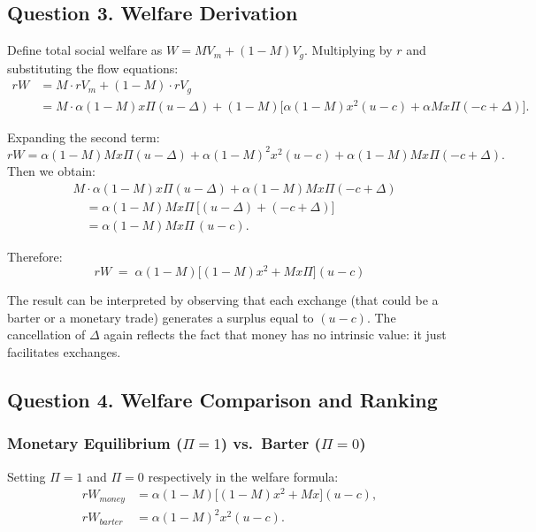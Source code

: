 \documentclass[11pt, a4paper]{article}
\begin{document}
\subsection*{Question 3. Welfare Derivation}

Define total social welfare as $W = MV_m + (1-M)V_g$. Multiplying by $r$ and
substituting the flow equations:
\begin{align*}
  rW &= M \cdot rV_m + (1-M) \cdot rV_g \\
     &= M \cdot \alpha(1-M)x\Pi(u-\Delta)
       + (1-M)\bigl[\alpha(1-M)x^2(u-c) + \alpha Mx\Pi(-c+\Delta)\bigr].
\end{align*}

Expanding the second term:
\[
  rW = \alpha(1-M)Mx\Pi(u-\Delta) + \alpha(1-M)^2x^2(u-c)
       + \alpha(1-M)Mx\Pi(-c+\Delta).
\]
Then we obtain:
\begin{align*}
  &M\cdot\alpha(1-M)x\Pi(u-\Delta) + \alpha(1-M)Mx\Pi(-c+\Delta) \\
  &\quad= \alpha(1-M)Mx\Pi\,\bigl[(u-\Delta)+(-c+\Delta)\bigr] \\
  &\quad= \alpha(1-M)Mx\Pi\,(u-c).
\end{align*}

Therefore:
\[
  rW \;=\; \alpha(1-M)\bigl[(1-M)x^2 + Mx\Pi\bigr](u-c)
\]

The result can be interpreted by observing that each exchange (that could be a barter or a monetary trade) generates a surplus equal to $(u-c)$. The cancellation of $\Delta$ again reflects the fact that money has no intrinsic value: it just facilitates exchanges.


\subsection*{Question 4. Welfare Comparison and Ranking}

\subsubsection*{Monetary Equilibrium ($\Pi = 1$) vs.\ Barter ($\Pi = 0$)}

Setting $\Pi = 1$ and $\Pi = 0$ respectively in the welfare formula:
\begin{align*}
  rW_{money}  &= \alpha(1-M)\bigl[(1-M)x^2 + Mx\bigr](u-c), \\[4pt]
  rW_{barter} &= \alpha(1-M)^2 x^2 (u-c).
\end{align*}
\end{document}
